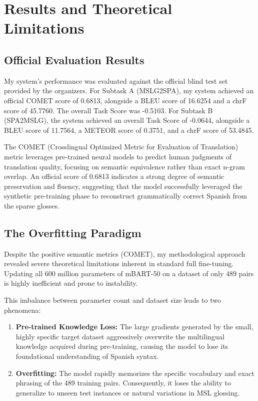 \documentclass[11pt,a4paper,english]{ceurart}
\begin{document}
\section{Results and Theoretical Limitations}

\subsection{Official Evaluation Results}
My system's performance was evaluated against the official blind test set provided by the organizers. For Subtask A (MSLG2SPA), my system achieved an official COMET score of 0.6813, alongside a BLEU score \cite{papineni2002bleu} of 16.6254 and a chrF score \cite{popovic2015chrf} of 45.7760. The overall Task Score was -0.5103. For Subtask B (SPA2MSLG), the system achieved an overall Task Score of -0.0644, alongside a BLEU score of 11.7564, a METEOR score \cite{banerjee2005meteor} of 0.3751, and a chrF score of 53.4845.

The COMET (Crosslingual Optimized Metric for Evaluation of Translation) metric \cite{rei2020comet} leverages pre-trained neural models to predict human judgments of translation quality, focusing on semantic equivalence rather than exact n-gram overlap. An official score of 0.6813 indicates a strong degree of semantic preservation and fluency, suggesting that the model successfully leveraged the synthetic pre-training phase to reconstruct grammatically correct Spanish from the sparse glosses.

\subsection{The Overfitting Paradigm}
Despite the positive semantic metrics (COMET), my methodological approach revealed severe theoretical limitations inherent in standard full fine-tuning. Updating all 600 million parameters of mBART-50 on a dataset of only 489 pairs is highly inefficient and prone to instability. 

This imbalance between parameter count and dataset size leads to two phenomena:
\begin{enumerate}
    \item \textbf{Pre-trained Knowledge Loss:} The large gradients generated by the small, highly specific target dataset aggressively overwrite the multilingual knowledge acquired during pre-training, causing the model to lose its foundational understanding of Spanish syntax.
    \item \textbf{Overfitting:} The model rapidly memorizes the specific vocabulary and exact phrasing of the 489 training pairs. Consequently, it loses the ability to generalize to unseen test instances or natural variations in MSL glossing.
\end{enumerate}
\end{document}
